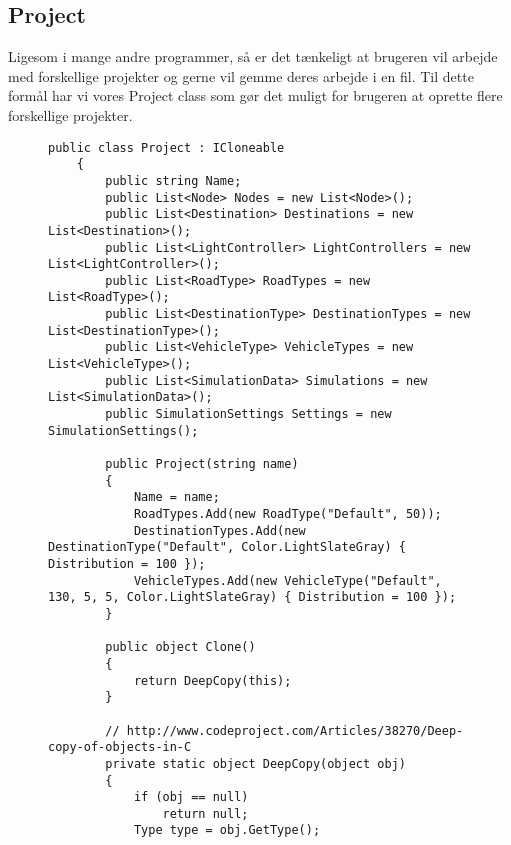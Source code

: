 \subsection{Project}
Ligesom i mange andre programmer, så er det tænkeligt at brugeren vil arbejde med forskellige projekter og gerne vil gemme deres arbejde i en fil. Til dette formål har vi vores Project class som gør det muligt for brugeren at oprette flere forskellige projekter.

\begin{figure}[H]
\begin{lstlisting}
public class Project : ICloneable
    {
        public string Name;
        public List<Node> Nodes = new List<Node>();
        public List<Destination> Destinations = new List<Destination>();
        public List<LightController> LightControllers = new List<LightController>();
        public List<RoadType> RoadTypes = new List<RoadType>();
        public List<DestinationType> DestinationTypes = new List<DestinationType>();
        public List<VehicleType> VehicleTypes = new List<VehicleType>();
        public List<SimulationData> Simulations = new List<SimulationData>();
        public SimulationSettings Settings = new SimulationSettings();
        
        public Project(string name)
        {
            Name = name;
            RoadTypes.Add(new RoadType("Default", 50));
            DestinationTypes.Add(new DestinationType("Default", Color.LightSlateGray) { Distribution = 100 });
            VehicleTypes.Add(new VehicleType("Default", 130, 5, 5, Color.LightSlateGray) { Distribution = 100 });
        }

        public object Clone()
        {
            return DeepCopy(this);
        }

        // http://www.codeproject.com/Articles/38270/Deep-copy-of-objects-in-C
        private static object DeepCopy(object obj)
        {
            if (obj == null)
                return null;
            Type type = obj.GetType();


\end{lstlisting}
\end{figure}
